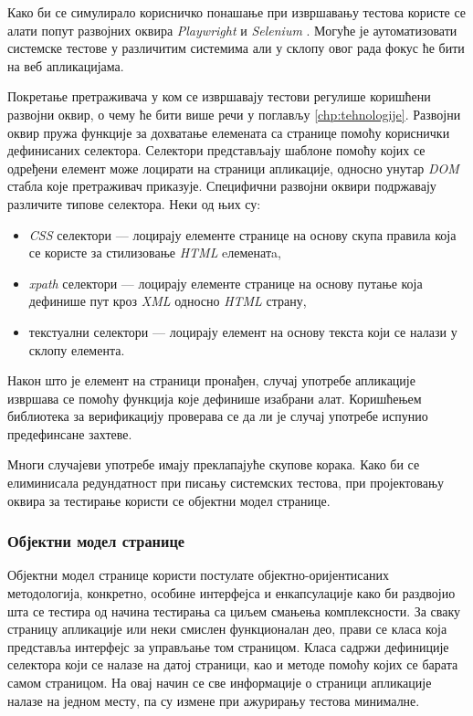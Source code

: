 \documentclass[12pt,oneside]{memoir}
\begin{document}
Како би се симулирало корисничко понашање при извршавању тестова користе се алати попут развојних оквира \textit{Playwright} \cite{playwright} и \textit{Selenium} \cite{playwrightVsSelenium}. Могуће је аутоматизовати системске тестове у различитим системима али у склопу овог рада фокус ће бити на веб апликацијама. 

Покретање претраживача у ком се извршавају тестови регулише коришћени развојни оквир, о чему ће бити више речи у поглављу \ref{chp:tehnologije}. Развојни оквир пружа функције за дохватање елемената са странице помоћу кориснички дефинисаних селектора. Селектори представљају шаблоне помоћу којих се одређени елемент може лоцирати на страници апликације, односно унутар \textit{DOM} стабла које претраживач приказује. Специфични развојни оквири подржавају различите типове селектора. Неки од њих су:

\begin{itemize}
\item \textit{CSS} селектори --- лоцирају елементе странице на основу скупа правила која се користе за стилизовање \textit{HTML} eлеменатa,
\item \textit{xpath} селектори --- лоцирају елементе странице на основу путање која дефинише пут кроз \textit{XML} односно \textit{HTML} страну,
\item текстуални селектори --- лоцирају елемент на основу текста који се налази у склопу елемента.
\end{itemize}

Након што је елемент на страници пронађен, случај употребе апликације извршава се помоћу функција које дефинише изабрани алат. Коришћењем библиотека за верификацију проверава се да ли је случај употребе испунио предефинсане захтеве.

Многи случајеви употребе имају преклапајуће скупове корака. Како би се елиминисала редундатност при писању системских тестова, при пројектовању оквира за тестирање користи се објектни модел странице.

\subsubsection{Објектни модел странице}

Објектни модел странице користи постулате објектно-оријентисаних методологија, конкретно, особине интерфејса и енкапсулације како би раздвојио шта се тестира од начина тестирања са циљем смањења комплексности. 
За сваку страницу апликације или неки смислен функционалан део, прави се класа која представља интерфејс за управљање том страницом. Класа садржи дефиниције селектора који се налазе на датој страници, као и методе помоћу којих се барата самом страницом. На овај начин се све информације о страници апликације налазе на једном месту, па су измене при ажурирању тестова минималне. 
\end{document}
